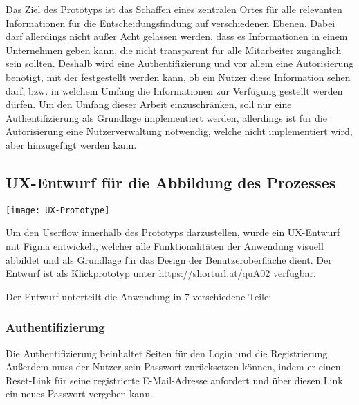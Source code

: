 Das Ziel des Prototyps ist das Schaffen eines zentralen Ortes für alle relevanten Informationen für die Entscheidungsfindung auf verschiedenen Ebenen. Dabei darf allerdings nicht außer Acht gelassen werden, dass es Informationen in einem Unternehmen geben kann, die nicht transparent für alle Mitarbeiter zugänglich sein sollten. Deshalb wird eine Authentifizierung und vor allem eine Autorisierung benötigt, mit der festgestellt werden kann, ob ein Nutzer diese Information sehen darf, bzw. in welchem Umfang die Informationen zur Verfügung gestellt werden dürfen. Um den Umfang dieser Arbeit einzuschränken, soll nur eine Authentifizierung als Grundlage implementiert werden, allerdings ist für die Autorisierung eine Nutzerverwaltung notwendig, welche nicht implementiert wird, aber hinzugefügt werden kann.

\subsection{UX-Entwurf für die Abbildung des Prozesses}
\vspace{20pt}
\begin{center}
    \begin{minipage}{\linewidth}
        \texttt{[image: UX-Prototype]}
    \end{minipage}
\end{center}
\vspace{20pt}

Um den Userflow innerhalb des Prototyps darzustellen, wurde ein UX-Entwurf mit Figma entwickelt, welcher alle Funktionalitäten der Anwendung visuell abbildet und als Grundlage für das Design der Benutzeroberfläche dient. Der Entwurf ist als Klickprototyp unter \href{https://www.figma.com/proto/6TjaUCKvs4DjwzTDEiWxiO/Prototype?type=design&node-id=0-1&scaling=min-zoom&starting-point-node-id=2%3A61}{https://shorturl.at/quA02} verfügbar.

Der Entwurf unterteilt die Anwendung in 7 verschiedene Teile:

\subsubsection{Authentifizierung}
Die Authentifizierung beinhaltet Seiten für den Login und die Registrierung. Außerdem muss der Nutzer sein Passwort zurücksetzen können, indem er einen Reset-Link für seine registrierte E-Mail-Adresse anfordert und über diesen Link ein neues Passwort vergeben kann.

